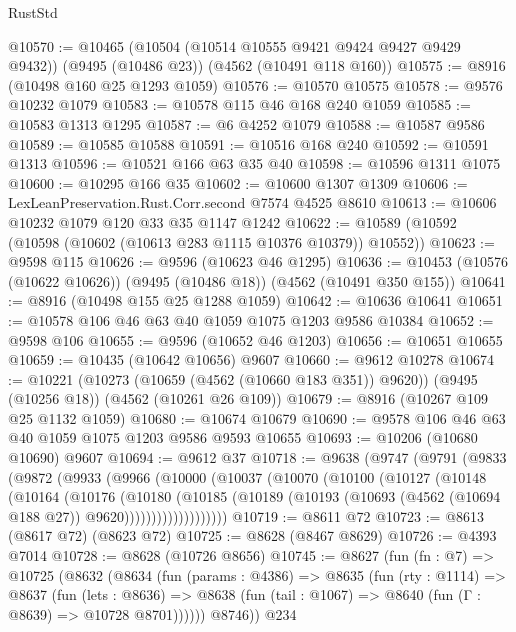 \begin{lexlean}{RustStd}
\begin{coremodule}
@10570 := @10465
    (@10504 (@10514 @10555 @9421 @9424 @9427 @9429 @9432))
    (@9495 (@10486 @23))
    (@4562 (@10491 @118 @160))
@10575 := @8916 (@10498 @160 @25 @1293 @1059)
@10576 := @10570 @10575
@10578 := @9576 @10232 @1079
@10583 := @10578 @115 @46 @168 @240 @1059
@10585 := @10583 @1313 @1295
@10587 := @6 @4252 @1079
@10588 := @10587 @9586
@10589 := @10585 @10588
@10591 := @10516 @168 @240
@10592 := @10591 @1313
@10596 := @10521 @166 @63 @35 @40
@10598 := @10596 @1311 @1075
@10600 := @10295 @166 @35
@10602 := @10600 @1307 @1309
@10606 := LexLeanPreservation.Rust.Corr.second @7574 @4525 @8610
@10613 := @10606 @10232 @1079 @120 @33 @35 @1147 @1242
@10622 := @10589 (@10592 (@10598 (@10602 (@10613 @283 @1115 @10376 @10379)) @10552))
@10623 := @9598 @115
@10626 := @9596 (@10623 @46 @1295)
@10636 := @10453 (@10576 (@10622 @10626)) (@9495 (@10486 @18)) (@4562 (@10491 @350 @155))
@10641 := @8916 (@10498 @155 @25 @1288 @1059)
@10642 := @10636 @10641
@10651 := @10578 @106 @46 @63 @40 @1059 @1075 @1203 @9586 @10384
@10652 := @9598 @106
@10655 := @9596 (@10652 @46 @1203)
@10656 := @10651 @10655
@10659 := @10435 (@10642 @10656) @9607
@10660 := @9612 @10278
@10674 := @10221
    (@10273 (@10659 (@4562 (@10660 @183 @351)) @9620))
    (@9495 (@10256 @18))
    (@4562 (@10261 @26 @109))
@10679 := @8916 (@10267 @109 @25 @1132 @1059)
@10680 := @10674 @10679
@10690 := @9578 @106 @46 @63 @40 @1059 @1075 @1203 @9586 @9593 @10655
@10693 := @10206 (@10680 @10690) @9607
@10694 := @9612 @37
@10718 := @9638
    (@9747
      (@9791
        (@9833
          (@9872
            (@9933
              (@9966
                (@10000
                  (@10037
                    (@10070
                      (@10100
                        (@10127
                          (@10148
                            (@10164
                              (@10176
                                (@10180
                                  (@10185
                                    (@10189
                                      (@10193
                                        (@10693 (@4562 (@10694 @188 @27)) @9620)))))))))))))))))))
@10719 := @8611 @72
@10723 := @8613 (@8617 @72) (@8623 @72)
@10725 := @8628 (@8467 @8629)
@10726 := @4393 @7014
@10728 := @8628 (@10726 @8656)
@10745 := @8627
    (fun (fn : @7) =>
    @10725
      (@8632
        (@8634
          (fun (params : @4386) =>
          @8635
            (fun (rty : @1114) =>
            @8637
              (fun (lets : @8636) =>
              @8638 (fun (tail : @1067) => @8640 (fun (Γ : @8639) => @10728 @8701))))))
        @8746))
    @234

\end{coremodule}
\end{lexlean}
